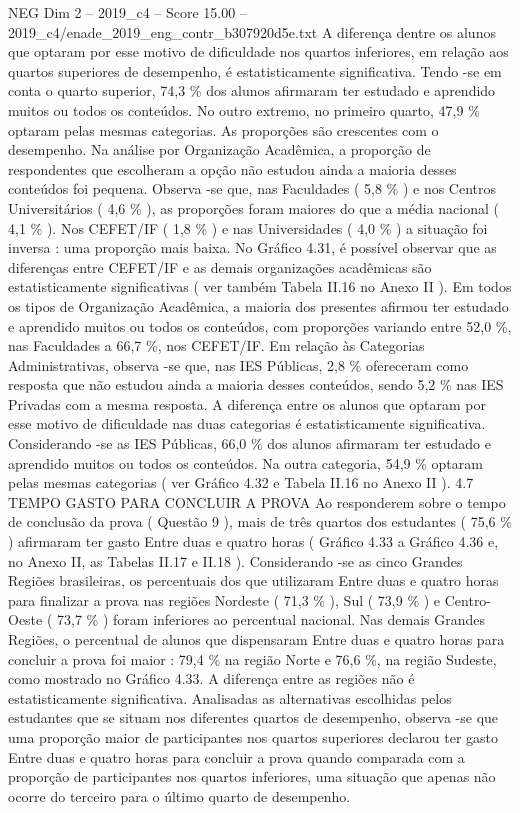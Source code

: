 \begin{textsample}{NEG Dim 2 – 2019\_c4 – Score 15.00 – 2019\_c4/enade\_2019\_eng\_contr\_b307920d5e.txt}
A diferença dentre os alunos que optaram por esse motivo de dificuldade nos quartos inferiores, em relação aos quartos superiores de desempenho, é estatisticamente significativa.
Tendo -se em conta o quarto superior, 74,3 \% dos alunos afirmaram ter estudado e aprendido muitos ou todos os conteúdos.
No outro extremo, no primeiro quarto, 47,9 \% optaram pelas mesmas categorias.
As proporções são crescentes com o desempenho.
Na análise por Organização Acadêmica, a proporção de respondentes que escolheram a opção não estudou ainda a maioria desses conteúdos foi pequena.
Observa -se que, nas Faculdades ( 5,8 \% ) e nos Centros Universitários ( 4,6 \% ), as proporções foram maiores do que a média nacional ( 4,1 \% ).
Nos CEFET/IF ( 1,8 \% ) e nas Universidades ( 4,0 \% ) a situação foi inversa : uma proporção mais baixa.
No Gráfico 4.31, é possível observar que as diferenças entre CEFET/IF e as demais organizações acadêmicas são estatisticamente significativas ( ver também Tabela II.16 no Anexo II ).
Em todos os tipos de Organização Acadêmica, a maioria dos presentes afirmou ter estudado e aprendido muitos ou todos os conteúdos, com proporções variando entre 52,0 \%, nas Faculdades a 66,7 \%, nos CEFET/IF.
Em relação às Categorias Administrativas, observa -se que, nas IES Públicas, 2,8 \% ofereceram como resposta que não estudou ainda a maioria desses conteúdos, sendo 5,2 \% nas IES Privadas com a mesma resposta.
A diferença entre os alunos que optaram por esse motivo de dificuldade nas duas categorias é estatisticamente significativa.
Considerando -se as IES Públicas, 66,0 \% dos alunos afirmaram ter estudado e aprendido muitos ou todos os conteúdos.
Na outra categoria, 54,9 \% optaram pelas mesmas categorias ( ver Gráfico 4.32 e Tabela II.16 no Anexo II ). 4.7 TEMPO GASTO PARA CONCLUIR A PROVA Ao responderem sobre o tempo de conclusão da prova ( Questão 9 ), mais de três quartos dos estudantes ( 75,6 \% ) afirmaram ter gasto Entre duas e quatro horas ( Gráfico 4.33 a Gráfico 4.36 e, no Anexo II, as Tabelas II.17 e II.18 ).
Considerando -se as cinco Grandes Regiões brasileiras, os percentuais dos que utilizaram Entre duas e quatro horas para finalizar a prova nas regiões Nordeste ( 71,3 \% ), Sul ( 73,9 \% ) e Centro-Oeste ( 73,7 \% ) foram inferiores ao percentual nacional.
Nas demais Grandes Regiões, o percentual de alunos que dispensaram Entre duas e quatro horas para concluir a prova foi maior : 79,4 \% na região Norte e 76,6 \%, na região Sudeste, como mostrado no Gráfico 4.33.
A diferença entre as regiões não é estatisticamente significativa.
Analisadas as alternativas escolhidas pelos estudantes que se situam nos diferentes quartos de desempenho, observa -se que uma proporção maior de participantes nos quartos superiores declarou ter gasto Entre duas e quatro horas para concluir a prova quando comparada com a proporção de participantes nos quartos inferiores, uma situação que apenas não ocorre do terceiro para o último quarto de desempenho.

\end{textsample}
